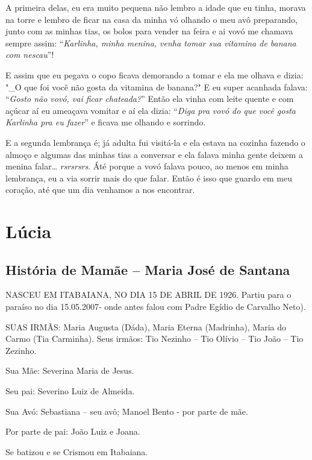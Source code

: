 \documentclass[
  brazil,
  a6paper,
  oneside,
  landscape,
  14pt]{scrbook}
\begin{document}
A primeira delas, eu era muito pequena não lembro a idade que eu tinha,
morava na torre e lembro de ficar na casa da minha vó olhando o meu avô
preparando, junto com as minhas tias, os bolos para vender na feira e ai
vovó me chamava sempre assim: ``\emph{Karlinha, minha menina, venha
tomar sua vitamina de banana com nescau}''!

E assim que eu pegava o copo ficava demorando a tomar e ela me olhava e
dizia: "\_O que foi você não gosta da vitamina de banana?" E eu super
acanhada falava: ``\emph{Gosto não vovó, vai ficar chateada?}'' Então
ela vinha com leite quente e com açúcar aí eu ameaçava vomitar e aí ela
dizia: ``\emph{Diga pra vovó do que você gosta Karlinha pra eu fazer}''
e ficava me olhando e sorrindo.

E a segunda lembrança é; já adulta fui visitá-la e ela estava na cozinha
fazendo o almoço e algumas das minhas tias a conversar e ela falava
minha gente deixem a menina falar\ldots{} \emph{rsrsrsrs}. Áté porque a
vovó falava pouco, ao menos em minha lembrança, eu a via sorrir mais do
que falar. Então é isso que guardo em meu coração, até que um dia
venhamos a nos encontrar.

\hypertarget{luxfacia}{%
\chapter{Lúcia}\label{luxfacia}}

\hypertarget{histuxf3ria-de-mamuxe3e-maria-josuxe9-de-santana}{%
\section{História de Mamãe -- Maria José de
Santana}\label{histuxf3ria-de-mamuxe3e-maria-josuxe9-de-santana}}

NASCEU EM ITABAIANA, NO DIA 15 DE ABRIL DE 1926. Partiu para o paraíso
no dia 15.05.2007- onde antes falou com Padre Egídio de Carvalho Neto).

SUAS IRMÃS: Maria Augusta (Dáda), Maria Eterna (Madrinha), Maria do
Carmo (Tia Carminha). Seus irmãos: Tio Nezinho -- Tio Olívio -- Tio João
-- Tio Zezinho.

Sua Mãe: Severina Maria de Jesus.

Seu pai: Severino Luiz de Almeida.

Sua Avó: Sebastiana -- seu avô; Manoel Bento - por parte de mãe.

Por parte de pai: João Luiz e Joana.

Se batizou e se Crismou em Itabaiana.
\end{document}
